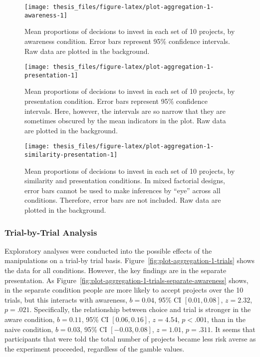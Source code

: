 \documentclass[a4paper, nobind]{templates/ociamthesis}
\theoremstyle{definition}
\theoremstyle{definition}
\theoremstyle{definition}
\theoremstyle{definition}
\theoremstyle{remark}
\begin{document}
\begin{figure}
\texttt{[image: thesis\_files/figure-latex/plot-aggregation-1-awareness-1]} \caption{Mean proportions of decisions to invest in each set of 10 projects, by awareness condition. Error bars represent 95\% confidence intervals. Raw data are plotted in the background.}\label{fig:plot-aggregation-1-awareness}
\end{figure}



\begin{figure}
\texttt{[image: thesis\_files/figure-latex/plot-aggregation-1-presentation-1]} \caption{Mean proportions of decisions to invest in each set of 10 projects, by presentation condition. Error bars represent 95\% confidence intervals. Here, however, the intervals are so narrow that they are sometimes obscured by the mean indicators in the plot. Raw data are plotted in the background.}\label{fig:plot-aggregation-1-presentation}
\end{figure}



\begin{figure}
\texttt{[image: thesis\_files/figure-latex/plot-aggregation-1-similarity-presentation-1]} \caption{Mean proportions of decisions to invest in each set of 10 projects, by similarity and presentation conditions. In mixed factorial designs, error bars cannot be used to make inferences by ``eye'' across all conditions. Therefore, error bars are not included. Raw data are plotted in the background.}\label{fig:plot-aggregation-1-similarity-presentation}
\end{figure}

\subsubsection{Trial-by-Trial Analysis}

Exploratory analyses were conducted into the possible effects of the
manipulations on a trial-by trial basis.
Figure~\ref{fig:plot-aggregation-1-trials} shows the data for all conditions.
However, the key findings are in the separate presentation. As
Figure~\ref{fig:plot-aggregation-1-trials-separate-awareness} shows, in the
separate condition people are more likely to accept projects over the 10 trials,
but this interacts with awareness,
\(b = 0.04\), 95\% CI \([0.01, 0.08]\), \(z = 2.32\), \(p = .021\).
Specifically, the relationship between choice and trial is stronger in the aware
condition,
\(b = 0.11\), 95\% CI \([0.06, 0.16]\), \(z = 4.54\), \(p < .001\), than in the
naive condition,
\(b = 0.03\), 95\% CI \([-0.03, 0.08]\), \(z = 1.01\), \(p = .311\). It seems that
participants that were told the total number of projects became less risk averse
as the experiment proceeded, regardless of the gamble values.
\end{document}

